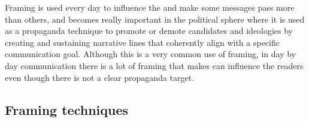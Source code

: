 Framing is used every day to influence the and make some messages pass more than others, and becomes really important in the political sphere where it is used as a propaganda technique to promote or demote candidates and ideologies by creating and sustaining narrative lines that coherently align with a specific communication goal.
Although this is a very common use of framing, in day by day communication there is a lot of framing that makes can influence the readers even though there is not a clear propaganda target.



\subsection{Framing techniques}
\label{ssec:lit_framing_theory}


